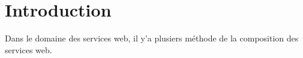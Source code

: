 
\section{Introduction}
Dans le domaine des services web, il y'a plusiers méthode de la composition des 
services web.\\
